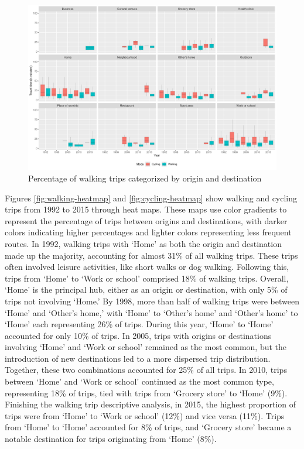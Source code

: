 \documentclass[preprint, 3p,
authoryear]{elsarticle} %
\begin{document}
\begin{figure}

{\centering \includegraphics[width=1\linewidth]{figures/destination_boxplots} 

}

\caption{Percentage of walking trips categorized by origin and destination}\label{fig:figure-boxplot}
\end{figure}

Figures \ref{fig:walking-heatmap} and \ref{fig:cycling-heatmap} show
walking and cycling trips from 1992 to 2015 through heat maps. These
maps use color gradients to represent the percentage of trips between
origins and destinations, with darker colors indicating higher
percentages and lighter colors representing less frequent routes. In
1992, walking trips with `Home' as both the origin and destination made
up the majority, accounting for almost 31\% of all walking trips. These
trips often involved leisure activities, like short walks or dog
walking. Following this, trips from `Home' to `Work or school' comprised
18\% of walking trips. Overall, `Home' is the principal hub, either as
an origin or destination, with only 5\% of trips not involving `Home.'
By 1998, more than half of walking trips were between `Home' and
`Other's home,' with `Home' to `Other's home' and `Other's home' to
`Home' each representing 26\% of trips. During this year, `Home' to
`Home' accounted for only 10\% of trips. In 2005, trips with origins or
destinations involving `Home' and `Work or school' remained as the most
common, but the introduction of new destinations led to a more dispersed
trip distribution. Together, these two combinations accounted for 25\%
of all trips. In 2010, trips between `Home' and `Work or school'
continued as the most common type, representing 18\% of trips, tied with
trips from `Grocery store' to `Home' (9\%). Finishing the walking trip
descriptive analysis, in 2015, the highest proportion of trips were from
`Home' to `Work or school' (12\%) and vice versa (11\%). Trips from
`Home' to `Home' accounted for 8\% of trips, and `Grocery store' became
a notable destination for trips originating from `Home' (8\%).
\end{document}
